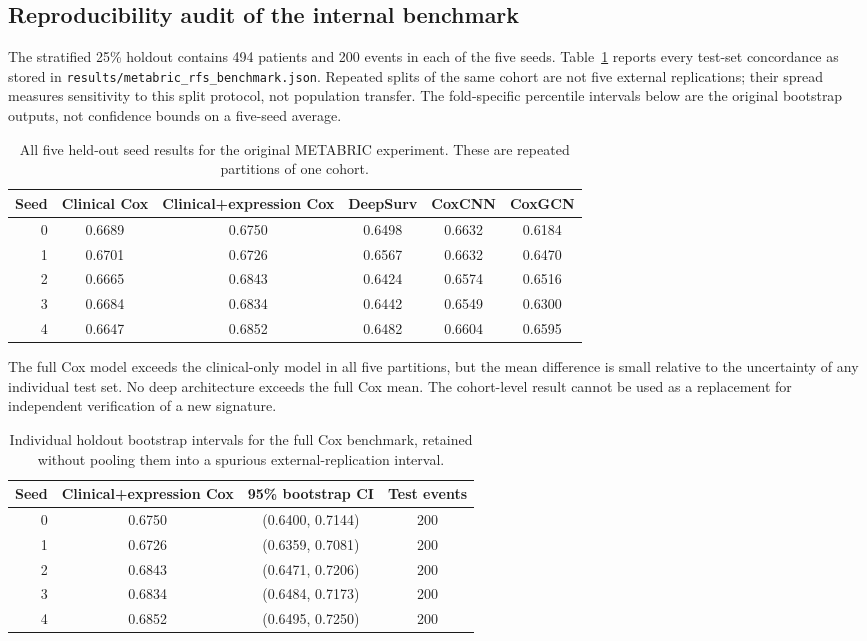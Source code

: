 \subsection{Reproducibility audit of the internal benchmark}
The stratified 25\% holdout contains 494 patients and 200 events in each of the five seeds. Table~\ref{tab:seed-audit} reports every test-set concordance as stored in \texttt{results/metabric\_rfs\_benchmark.json}. Repeated splits of the same cohort are not five external replications; their spread measures sensitivity to this split protocol, not population transfer. The fold-specific percentile intervals below are the original bootstrap outputs, not confidence bounds on a five-seed average.
\begin{table}[htbp]\centering\small
\begin{tabular}{rccccc}\hline
Seed & Clinical Cox & Clinical+expression Cox & DeepSurv & CoxCNN & CoxGCN \\ \hline
0 & 0.6689 & 0.6750 & 0.6498 & 0.6632 & 0.6184 \\
1 & 0.6701 & 0.6726 & 0.6567 & 0.6632 & 0.6470 \\
2 & 0.6665 & 0.6843 & 0.6424 & 0.6574 & 0.6516 \\
3 & 0.6684 & 0.6834 & 0.6442 & 0.6549 & 0.6300 \\
4 & 0.6647 & 0.6852 & 0.6482 & 0.6604 & 0.6595 \\
\hline\end{tabular}
\caption{All five held-out seed results for the original METABRIC experiment. These are repeated partitions of one cohort.}\label{tab:seed-audit}
\end{table}
The full Cox model exceeds the clinical-only model in all five partitions, but the mean difference is small relative to the uncertainty of any individual test set. No deep architecture exceeds the full Cox mean. The cohort-level result cannot be used as a replacement for independent verification of a new signature.
\begin{table}[htbp]\centering\small
\begin{tabular}{rccc}\hline
Seed & Clinical+expression Cox & 95\% bootstrap CI & Test events \\ \hline
0 & 0.6750 & (0.6400, 0.7144) & 200 \\
1 & 0.6726 & (0.6359, 0.7081) & 200 \\
2 & 0.6843 & (0.6471, 0.7206) & 200 \\
3 & 0.6834 & (0.6484, 0.7173) & 200 \\
4 & 0.6852 & (0.6495, 0.7250) & 200 \\
\hline\end{tabular}
\caption{Individual holdout bootstrap intervals for the full Cox benchmark, retained without pooling them into a spurious external-replication interval.}\label{tab:seed-ci}
\end{table}
